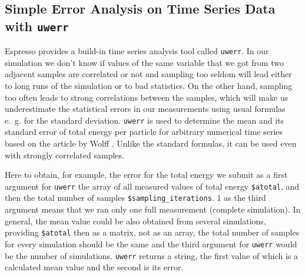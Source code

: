 \documentclass[
paper=a4,                       %
fontsize=11pt,                  %
twoside,                        %
footsepline,                    %
headsepline,                    %
headinclude=false,              %
footinclude=false,              %
pagesize,                       %
]{scrartcl}
\begin{document}
   





   
   
\subsection{Simple Error Analysis on Time Series Data with \texttt{uwerr}}

  \noindent Espresso provides a build-in time series analysis tool called \lstinline|uwerr|.
  In our simulation we don't know if values of the same variable that we got from two adjacent samples are
  correlated or not and sampling too seldom will lead either to long runs of the simulation
  or to bad statistics. On the other hand, sampling too often leads to strong correlations between the samples,
  which will make us underestimate the statistical errors in our measurements using usual formulas e.~g.
  for the standard deviation.
  \lstinline|uwerr| is used to determine the mean and its standard 
  error  of total energy per particle for arbitrary numerical time series based on
  the article by Wolff \cite{wolff}. Unlike the standard formulas, it can be used even with strongly correlated samples.

  Here to obtain, for example, the error for the total energy we submit as a first argument for 
  \lstinline|uwerr| the array of all measured values of total energy   \verb"$atotal", and then the total
  number of samples   \verb"$sampling_iterations". 1 as the third argument means that we ran only
  one full measurement (complete simulation). In general, the mean value could be also obtained
  from several simulations, providing  \verb"$atotal" then as a matrix, not as an array, the total
  number of samples for every simulation should be the same and the third argument for \lstinline|uwerr|
  would be the number of simulations. \lstinline|uwerr| returns a string, the first value of which is 
  a calculated mean value and the second is its error.
\end{document}
